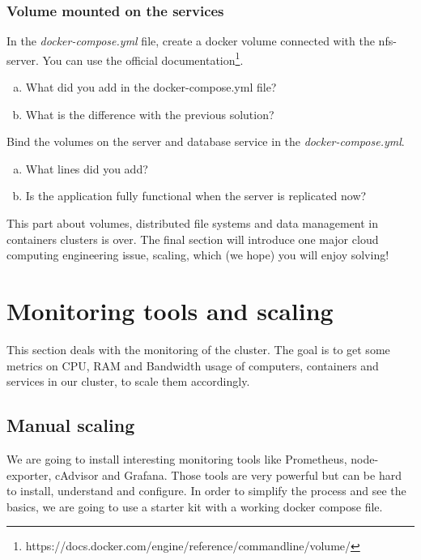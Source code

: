 \documentclass[a4paper,11pt]{exam}
\begin{document}
\subsubsection{Volume mounted on the services}

\begin{questions}
	\question In the \textit{docker-compose.yml} file, create a docker volume connected with the nfs-server. 
You can use the official documentation\footnote{https://docs.docker.com/engine/reference/commandline/volume/}.
	\begin{enumerate}[(a)]
		\item What did you add in the docker-compose.yml file?
		\item What is the difference with the previous solution?
	\end{enumerate}
	\question Bind the volumes on the server and database service in the \textit{docker-compose.yml}.
	\begin{enumerate}[(a)]
		\item What lines did you add?
		\item Is the application fully functional when the server is replicated now?
	\end{enumerate}
\end{questions}

This part about volumes, distributed file systems and data management in containers clusters is over.
The final section will introduce one major cloud computing engineering issue, scaling, which (we hope) you will enjoy solving!

\clearpage

\section{Monitoring tools and scaling}

This section deals with the monitoring of the cluster. 
The goal is to get some metrics on CPU, RAM and Bandwidth usage of computers, containers and services in our cluster, to scale them accordingly.

\subsection{Manual scaling}

We are going to install interesting monitoring tools like Prometheus, node-exporter, cAdvisor and Grafana. 
Those tools are very powerful but can be hard to install, understand and configure.
In order to simplify the process and see the basics, we are going to use a starter kit with a working docker compose file.
\end{document}
